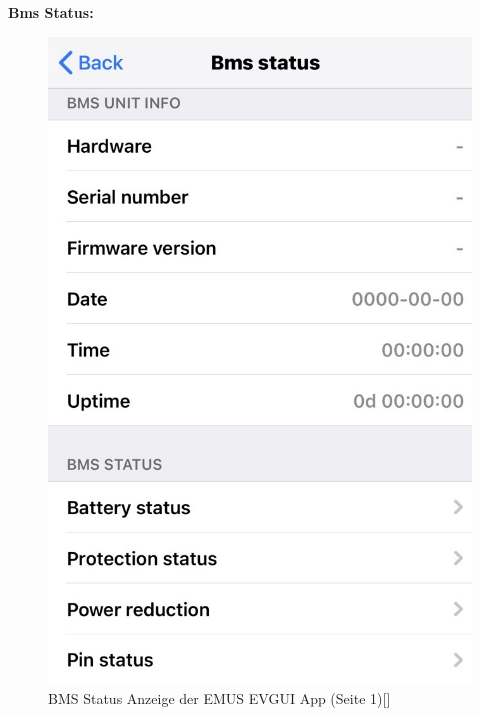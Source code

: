 \textbf{Bms Status:}
\begin{figure}[H]
	\begin{center}
		\includegraphics[scale=0.4]{figures/Akku/BMSStatus.png}
		\caption{BMS Status Anzeige der EMUS EVGUI App (Seite 1)[\cite{BM}]}
		\label{fig: BMS Status Anzeige der EMUS EVGUI App (Seite 1)}
	\end{center}
\end{figure}
\newpage

